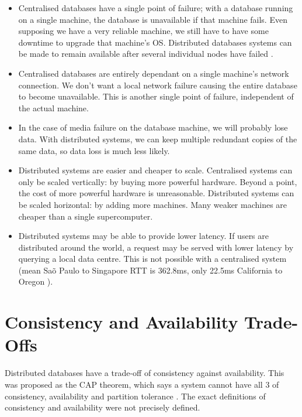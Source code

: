 \documentclass[12pt,a4paper,twoside,openright]{report}
\begin{document}
\begin{itemize}
\item
Centralised databases have a single point of failure; with a database running on a single machine, the database is unavailable if that machine fails. Even supposing we have a very reliable machine, we still have to have some downtime to upgrade that machine's OS. Distributed databases systems can be made to remain available after several individual nodes have failed \cite{bacon2003operating}.

\item
Centralised databases are entirely dependant on a single machine's network connection. We don't want a local network failure causing the entire database to become unavailable. This is another single point of failure, independent of the actual machine.

\item
In the case of media failure on the database machine, we will probably lose data. With distributed systems, we can keep multiple redundant copies of the same data, so data loss is much less likely.

\item
Distributed systems are easier and cheaper to scale. Centralised systems can only be scaled vertically: by buying more powerful hardware. Beyond a point, the cost of more powerful hardware is unreasonable. Distributed systems can be scaled horizontal: by adding more machines. Many weaker machines are cheaper than a single supercomputer.

\item
Distributed systems may be able to provide lower latency. If users are distributed around the world, a request may be served with lower latency by querying a local data centre. This is not possible with a centralised system (mean Sa\~o Paulo to Singapore RTT is 362.8ms, only 22.5ms California to Oregon \cite{bailis2013highly}).

\end{itemize}

\section{Consistency and Availability Trade-Offs}

Distributed databases have a trade-off of consistency against availability. This was proposed as the CAP theorem, which says a system cannot have all 3 of consistency, availability and partition tolerance \cite{brewer}. The exact definitions of consistency and availability were not precisely defined.
\end{document}
